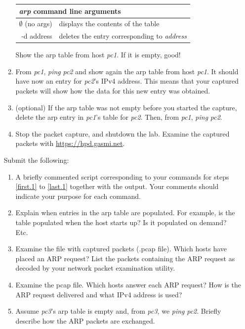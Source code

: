 \documentclass[12pt]{book}
\begin{document}
\begin{enumerate}
\begin{enumerate}[label=(\roman*)]
    \smallskip
    \begin{tabularx}{0.9\textwidth}{r l} \toprule
      \multicolumn{2}{l}{\emph{arp} command line arguments} \\ \midrule
      $\emptyset$ (no args) & displays the contents of the table \\
      -d address & deletes the  entry corresponding to \emph{address} \\ \bottomrule
    \end{tabularx}
    \smallskip

    Show the arp table from host \emph{pc1}. If it is empty, good!
    
  \item From \emph{pc1}, \emph{ping} \emph{pc2} and show again the arp table from host \emph{pc1}. It should have now an entry for \emph{pc2}'s IPv4 address. This means that your captured packets will show how the data for this new entry was obtained.
    
  \item (optional) If the arp table was not empty before you started the capture, delete the arp entry in \emph{pc1}'s table for \emph{pc2}. Then, from \emph{pc1}, \emph{ping} \emph{pc2}.

  \item\label{last.1} Stop the packet capture, and shutdown the lab. Examine the captured packets with   \url{https://hpd.gasmi.net}.
  \end{enumerate}

  Submit the following:
  \begin{enumerate}[label=(\alph*)]
  \item A briefly commented script corresponding to your commands for steps \ref{first.1} to \ref{last.1} together with the output. Your comments should indicate your purpose for each command.
  \item Explain when entries in the arp table are populated. For example, is the table populated when the host starts up? Is it populated on demand? Etc.
  \item Examine the file with captured packets (.pcap file). Which hosts have placed an ARP request? List the packets containing the ARP request as decoded     by your network packet examination utility.
    \item Examine the pcap file. Which hosts answer each ARP request?
      How is the ARP request delivered and what IPv4
      address is used?
  \item Assume \emph{pc3}'s arp table is empty and, from \emph{pc3}, we \emph{ping} \emph{pc2}. Briefly describe how the ARP packets are exchanged. 
  \end{enumerate}


\end{enumerate}
\end{document}
